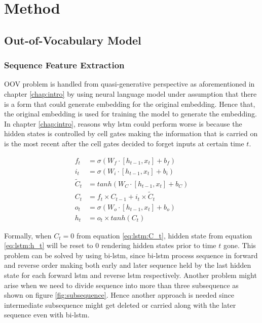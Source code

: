 \chapter{Method}
\label{chap:method}

\section{Out-of-Vocabulary Model}
    \subsection{Sequence Feature Extraction}
        OOV problem is handled from quasi-generative perspective as
        aforementioned in chapter \ref{chap:intro} by using neural
        language model under assumption that there is a form that
        could generate embedding for the original embedding. Hence
        that, the original embedding is used for training the model to
        generate the embedding. In chapter \ref{chap:intro}, reasons
        why lstm could perform worse is because the hidden states is
        controlled by cell gates making the information that is
        carried on is the most recent after the cell gates decided to
        forget inputs at certain time $t$. 

        \begin{align}
            \label{eq:lstm:f_t}
            f_t &= \sigma(W_f \cdot [h_{t-1}, x_t] + b_f) \\
            \label{eq:lstm:i_t}    
            i_t &= \sigma(W_i \cdot [h_{t-1}, x_t] + b_i) \\
            \label{eq:lstm:Cc_t}
            \tilde{C}_t &= tanh(W_C \cdot [h_{t-1}, x_t] + b_C) \\
            \label{eq:lstm:C_t}
            C_t &= f_t \times C_{t-1} + i_t \times \tilde{C}_t \\
            \label{eq:lstm:o_t}
            o_t &= \sigma(W_o \cdot [h_{t-1}, x_t] + b_o) \\
            \label{eq:lstm:h_t}
            h_t &= o_t \times tanh(C_t)
        \end{align}

        Formally, when $C_t = 0$ from equation \ref{eq:lstm:C_t},
        hidden state from equation \ref{eq:lstm:h_t} will be reset to
        $0$ rendering hidden states prior to time $t$ gone. This
        problem can be solved by using bi-lstm, since bi-lstm process
        sequence in forward and reverse order making both early and
        later sequence held by the last hidden state for each forward
        lstm and reverse lstm respectively. Another problem might
        arise when we need to divide sequence into more than three
        subsequence as shown on figure \ref{fig:subsequence}. Hence
        another approach is needed since intermediate subsequence
        might get deleted or carried along with the later sequence
        even with bi-lstm.

